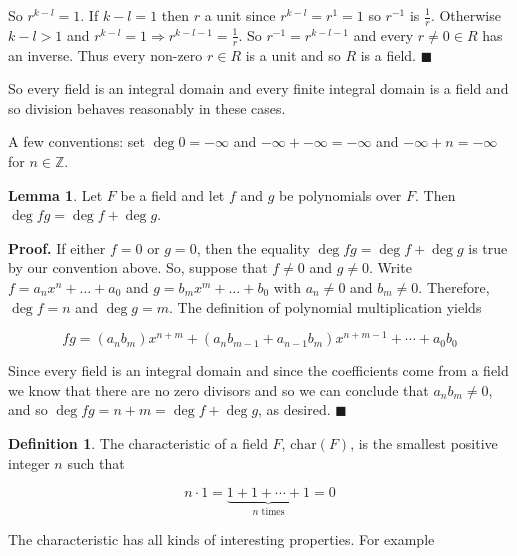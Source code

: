 \documentclass{article}
\theoremstyle{definition}
\newtheorem{definition}{Definition}[section]
\newtheorem{lemma}{Lemma}[section]
\begin{document}
\bigskip
\noindent
So $ r^{k-l} = 1 $. If $k-l = 1$ then $r$ a unit since $r^{k-l} =
r^{1} = 1$ so $r^{-1}$ is $\frac{1}{r}$. Otherwise $k-l > 1$ and
$r^{k-l} = 1 \Rightarrow r^{k-l-1} = \frac{1}{r}$.  So $r^{-1} =
r^{k-l -1}$ and every $r \neq 0 \in R$ has an inverse. Thus every
non-zero $r \in R$ is a unit and so $R$ is a
field. $\blacksquare$

\bigskip
\noindent
So every field is an integral domain and every finite integral
domain is a field and so division behaves reasonably in these
cases.  


\bigskip
\noindent
A few conventions: set $\deg 0 = -\infty$ and $-\infty + -\infty
= - \infty$ and $-\infty +n = -\infty$ for $n \in \mathbb{Z}$.

\begin{lemma}
Let $F$ be a field and let $f$ and $g$ be polynomials over
$F$. Then $\deg fg = \deg f  + \deg g$. 
\label{lemma:degree}
\end{lemma}

\noindent
\textbf{Proof.} If either $f = 0$ or $g = 0$, then the equality
$\deg fg = \deg f + \deg g$ is true by our convention above. So,
suppose that $f \neq 0$ and $g \neq 0$. Write $f = a_n x^n +
\hdots + a_0$ and $g = b_m x^m + \hdots + b_0$ with $a_n \neq 0$
and $b_m \neq 0$.  Therefore, $\deg f = n$ and $\deg g = m$. The
definition of polynomial multiplication yields

\smallskip
\begin{equation*}
fg = (a_nb_m)x^{n+m} +(a_nb_{m-1} + a_{n-1} b_m)  x^{n+m-1} +
\cdots +a_0b_0 
\end{equation*}

\bigskip
\noindent
Since every field is an integral domain and since the
coefficients come from a field we know that there are no zero
divisors and so we can conclude that $a_nb_m \neq 0$, and so
$\deg fg = n + m = \deg f+ \deg g$, as desired. $\blacksquare$

\begin{definition}
The characteristic of a field $F$, $\text{char}(F)$, is the
smallest positive integer $n$ such that 

\medskip
\begin{equation*}
n \cdot 1 = \underbrace{1 + 1 + \cdots + 1}_{n \text{ times}} = 0
\end{equation*}
\end{definition}

\bigskip
\noindent
The characteristic has all kinds of interesting properties. For
example 
\end{document}
